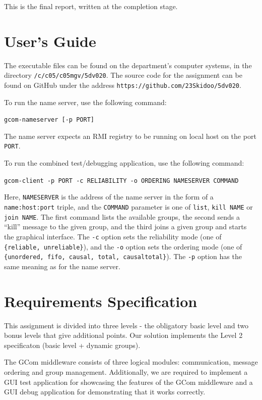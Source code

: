\documentclass[10pt, oneside]{article}
\begin{document}
This is the final report, written at the completion stage.

\section{User's Guide}

The executable files can be found on the department's computer systems, in the
directory \texttt{/c/c05/c05mgv/5dv020}. The source code for the assignment can
be found on GitHub under the address
\texttt{https://github.com/23Skidoo/5dv020}.

To run the name server, use the following command:
\begin{center}\texttt{gcom-nameserver [-p PORT]}\end{center}

The name server expects an RMI registry to be running on local host on the port
\texttt{PORT}.

To run the combined test/debugging application, use the following command:
\begin{center}\texttt{gcom-client -p PORT -c RELIABILITY -o ORDERING NAMESERVER COMMAND}\end{center}

Here, \texttt{NAMESERVER} is the address of the name server in the form of a
\texttt{name:host:port} triple, and the \texttt{COMMAND} parameter is one of
\texttt{list}, \texttt{kill NAME} or \texttt{join NAME}. The first command lists
the available groups, the second sends a ``kill'' message to the given group,
and the third joins a given group and starts the graphical interface. The
\texttt{-c} option sets the reliability mode (one of \texttt{\{reliable,
  unreliable\}}), and the \texttt{-o} option sets the ordering mode (one of
\texttt{\{unordered, fifo, causal, total, causaltotal\}}). The \texttt{-p}
option has the same meaning as for the name server.

\section{Requirements Specification}

This assignment is divided into three levels - the obligatory basic level and
two bonus levels that give additional points. Our solution implements the Level
2 specificaton (basic level + dynamic groups).

The GCom middleware consists of three logical modules: communication, message
ordering and group management. Additionally, we are required to implement a GUI
test application for showcasing the features of the GCom middleware and a GUI
debug application for demonstrating that it works correctly.
\end{document}
